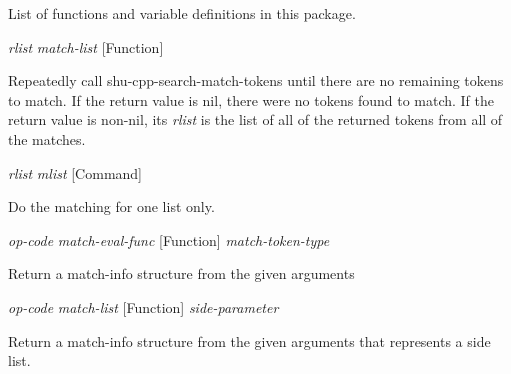 List of functions and variable definitions in this package.



\vspace{1em}
\noindent
{}
\usebox{\funcname}\emph{rlist} \emph{match-list}
 \hfill [Function]
\hspace*{\wd\funcname}

\begin{doc-string}
Repeatedly call shu-cpp-search-match-tokens until there are no remaining tokens
to match.  If the return value is nil, there were no tokens found to match.  If
the return value is non-nil, its \emph{rlist} is the list of all of the returned tokens
from all of the matches.
\end{doc-string}

\vspace{1em}
\noindent
{}
\usebox{\funcname}\emph{rlist} \emph{mlist}
 \hfill [Command]
\hspace*{\wd\funcname}

\begin{doc-string}
Do the matching for one list only.
\end{doc-string}

\vspace{1em}
\noindent
{}
\usebox{\funcname}\emph{op-code} \emph{match-eval-func}
 \hfill [Function]
\hspace*{\wd\funcname}\emph{match-token-type}
\hspace*{\wd\funcname}

\begin{doc-string}
Return a match-info structure from the given arguments
\end{doc-string}

\vspace{1em}
\noindent
{}
\usebox{\funcname}\emph{op-code} \emph{match-list}
 \hfill [Function]
\hspace*{\wd\funcname}\emph{side-parameter}

\begin{doc-string}
Return a match-info structure from the given arguments that represents a
side list.
\end{doc-string}

